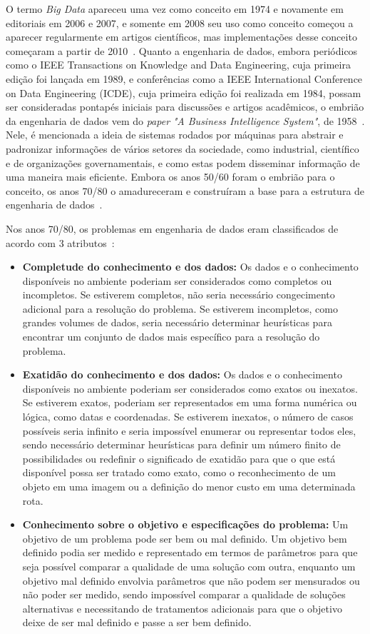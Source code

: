 \documentclass[portugues]{ic-tese}
\begin{document}
O termo \textit{Big Data} apareceu uma vez como conceito em 1974 e novamente em editoriais em 2006 e 2007, e somente em 2008 seu uso como conceito começou a aparecer regularmente em artigos científicos, mas implementações desse conceito começaram a partir de 2010~\citep{Raban_2020}. Quanto a engenharia de dados, embora periódicos como o IEEE Transactions on Knowledge and Data Engineering, cuja primeira edição foi lançada em 1989, e conferências como a IEEE International Conference on Data Engineering (ICDE), cuja primeira edição foi realizada em 1984, possam ser consideradas pontapés iniciais para discussões e artigos acadêmicos, o embrião da engenharia de dados vem do \textit{paper} \textit{"A Business Intelligence System"}, de 1958~\citep{Panoply_2017}. Nele, é mencionada a ideia de sistemas rodados por máquinas para abstrair e padronizar informações de vários setores da sociedade, como industrial, científico e de organizações governamentais, e como estas podem disseminar informação de uma maneira mais eficiente. Embora os anos 50/60 foram o embrião para o conceito, os anos 70/80 o amadureceram e construíram a base para a estrutura de engenharia de dados~\citep{Panoply_2017}.

Nos anos 70/80, os problemas em engenharia de dados eram classificados de acordo com 3 atributos~\citep{IEEE_1989}:

\begin{itemize}
\item \textbf{Completude do conhecimento e dos dados:} Os dados e o conhecimento disponíveis no ambiente poderiam ser considerados como completos ou incompletos. Se estiverem completos, não seria necessário congecimento adicional para a resolução do problema. Se estiverem incompletos, como grandes volumes de dados, seria necessário determinar heurísticas para encontrar um conjunto de dados mais específico para a resolução do problema.
\item \textbf{Exatidão do conhecimento e dos dados:} Os dados e o conhecimento disponíveis no ambiente poderiam ser considerados como exatos ou inexatos. Se estiverem exatos, poderiam ser representados em uma forma numérica ou lógica, como datas e coordenadas. Se estiverem inexatos, o número de casos possíveis seria infinito e seria impossível enumerar ou representar todos eles, sendo necessário determinar heurísticas para definir um número finito de possibilidades ou redefinir o significado de exatidão para que o que está disponível possa ser tratado como exato, como o reconhecimento de um objeto em uma imagem ou a definição do menor custo em uma determinada rota.
\item \textbf{Conhecimento sobre o objetivo e especificações do problema:} Um objetivo de um problema pode ser bem ou mal definido. Um objetivo bem definido podia ser medido e representado em termos de parâmetros para que seja possível comparar a qualidade de uma solução com outra, enquanto um objetivo mal definido envolvia parâmetros que não podem ser mensurados ou não poder ser medido, sendo impossível comparar a qualidade de soluções alternativas e necessitando de tratamentos adicionais para que o objetivo deixe de ser mal definido e passe a ser bem definido. 
\end{itemize}
\end{document}
